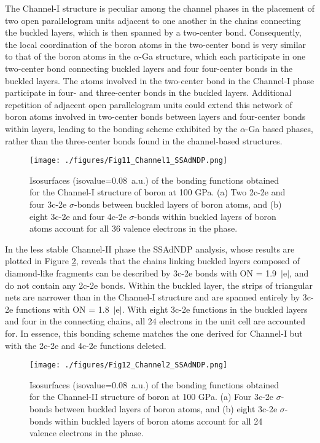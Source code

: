 \documentclass[reprint,aps,prl,twocolumn,letterpaper]{revtex4-2}
\newlength{\figurewidth}
\begin{document}
The Channel-I structure is peculiar among the channel phases in the placement of two open parallelogram units adjacent to one another in the chains connecting the buckled layers, which is then spanned by a two-center bond. Consequently, the local coordination of the boron atoms in the two-center bond is very similar to that of the boron atoms in the $\alpha$-Ga structure, which each participate in one two-center bond connecting buckled layers and four four-center bonds in the buckled layers. The atoms involved in the two-center bond in the Channel-I phase participate in four- and three-center bonds in the buckled layers. Additional repetition of adjacent open parallelogram units could extend this network of boron atoms involved in two-center bonds between layers and four-center bonds within layers, leading to the bonding scheme exhibited by the $\alpha$-Ga based phases, rather than the three-center bonds found in the channel-based structures.


\begin{figure}
\begin{center}
\texttt{[image: ./figures/Fig11\_Channel1\_SSAdNDP.png]}
\end{center}
\caption{Isosurfaces (isovalue=0.08~a.u.) of the bonding functions obtained for the Channel-I structure of boron at 100 GPa. (a) Two 2c-2e and four 3c-2e $\sigma$-bonds between buckled layers of boron atoms, and (b) eight 3c-2e and four 4c-2e $\sigma$-bonds within buckled layers of boron atoms account for all 36 valence electrons in the phase.
\label{fig:Fig11_Channel1_SSAdNDP.png}}
\end{figure}

In the less stable Channel-II phase the SSAdNDP analysis, whose results are plotted in Figure \ref{fig:Fig12_Channel2_SSAdNDP.png}, reveals that the chains linking buckled layers composed of diamond-like fragments can be described by 3c-2e bonds with ON = 1.9~$\vert$e$\vert$, and do not contain any 2c-2e bonds. Within the buckled layer, the strips of triangular nets are narrower than in the Channel-I structure and are spanned entirely by 3c-2e functions with ON = 1.8~$\vert$e$\vert$. With eight 3c-2e functions in the buckled layers and four in the connecting chains, all 24 electrons in the unit cell are accounted for. In essence, this bonding scheme matches the one derived for Channel-I but with the 2c-2e and 4c-2e functions deleted.
 
\begin{figure}
\begin{center}
\texttt{[image: ./figures/Fig12\_Channel2\_SSAdNDP.png]}
\end{center}
\caption{Isosurfaces (isovalue=0.08~a.u.) of the bonding functions obtained for the Channel-II structure of boron at 100 GPa. (a) Four 3c-2e $\sigma$-bonds between buckled layers of boron atoms, and (b) eight 3c-2e $\sigma$-bonds within buckled layers of boron atoms account for all 24 valence electrons in the phase.
\label{fig:Fig12_Channel2_SSAdNDP.png}}
\end{figure}
\end{document}
